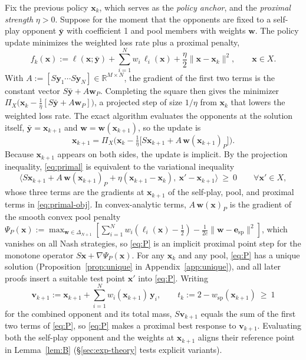 \documentclass{article}
\theoremstyle{plain}
\theoremstyle{remark}
\newcommand{\Proj}{\Pi}
\newcommand{\simplex}{\Delta}
\newcommand{\bx}{{\bm{x}}}
\newcommand{\by}{{\bm{y}}}
\newcommand{\bv}{{\bm{v}}}
\newcommand{\bw}{{\bm{w}}}
\newcommand{\be}{{\bm{e}}}
\newcommand{\esp}{\be_{\mathrm{sp}}}
\newcommand{\wsp}{w_{\mathrm{sp}}}
\begin{document}
Fix the previous policy $\bx_k$, which serves as the \emph{policy anchor}, and the \emph{proximal strength} $\eta>0$. Suppose for the moment that the opponents are fixed to a self-play opponent $\bar{\by}$ with coefficient 1 and pool members with weights $\bw$. The policy update minimizes the weighted loss rate plus a proximal penalty,
\begin{equation}
f_k(\bx):=\ell(\bx;\bar{\by})+\sum_{i=1}^Nw_i\,\ell_i(\bx)+\frac\eta2\|\bx-\bx_k\|^2,\qquad \bx\in X .
\label{eq:primal-obj}
\end{equation}
With $A:=[S\by_1\cdots S\by_N]\in\mathbb R^{M\times N}$, the gradient of the first two terms is the constant vector $S\bar{\by}+A\bw_P$. Completing the square then gives the minimizer $\Proj_X\big(\bx_k-\tfrac1\eta[S\bar{\by}+A\bw_P]\big)$, a projected step of size $1/\eta$ from $\bx_k$ that lowers the weighted loss rate. The exact algorithm evaluates the opponents at the solution itself, $\bar{\by}=\bx_{k+1}$ and $\bw=\bw(\bx_{k+1})$, so the update is
\begin{equation}
\bx_{k+1}=\Proj_X\Big(\bx_k-\tfrac1\eta\big[S\bx_{k+1}+A\,\bw(\bx_{k+1})_P\big]\Big).
\label{eq:primal}
\end{equation}
Because $\bx_{k+1}$ appears on both sides, the update is implicit. By the projection inequality, \eqref{eq:primal} is equivalent to the variational inequality
\begin{equation}
\big\langle S\bx_{k+1}+A\,\bw(\bx_{k+1})_P+\eta(\bx_{k+1}-\bx_k),\ \bx'-\bx_{k+1}\big\rangle\ \ge\ 0\qquad\forall \bx'\in X ,
\label{eq:P}
\end{equation}
whose three terms are the gradients at $\bx_{k+1}$ of the self-play, pool, and proximal terms in \eqref{eq:primal-obj}. In convex-analytic terms, $A\,\bw(\bx)_P$ is the gradient of the smooth convex pool penalty $\Psi_P(\bx):=\max_{\bw\in\simplex_{N+1}}[\sum_{i=1}^Nw_i(\ell_i(\bx)-\tfrac12)-\tfrac1{2c}\|\bw-\esp\|^2]$, which vanishes on all Nash strategies, so \eqref{eq:P} is an implicit proximal point step for the monotone operator $S\bx+\nabla\Psi_P(\bx)$. For any $\bx_k$ and any pool, \eqref{eq:P} has a unique solution (Proposition~\ref{prop:unique} in Appendix~\ref{app:unique}), and all later proofs insert a suitable test point $\bx'$ into \eqref{eq:P}. Writing
\[
\bv_{k+1}:=\bx_{k+1}+\sum_{i=1}^Nw_i(\bx_{k+1})\,\by_i,\qquad t_k:=2-\wsp(\bx_{k+1})\ \ge\ 1
\]
for the combined opponent and its total mass, $S\bv_{k+1}$ equals the sum of the first two terms of \eqref{eq:P}, so \eqref{eq:P} makes a proximal best response to $\bv_{k+1}$. Evaluating both the self-play opponent and the weights at $\bx_{k+1}$ aligns their reference point in Lemma~\ref{lem:B} (\S\ref{sec:exp-theory} tests explicit variants).
\end{document}
